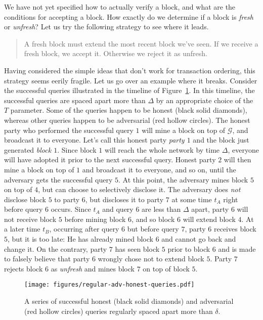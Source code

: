 We have not yet specified how to actually verify a block, and what are the conditions for
accepting a block. How exactly do we determine if a block is \emph{fresh} or \emph{unfresh}? Let
us try the following strategy to see where it leads.

\begin{quote}
A fresh block must extend the most recent block we've seen. If we receive a fresh block, we accept
it. Otherwise we reject it as unfresh.
\end{quote}

Having considered the simple ideas that don't work for transaction ordering, this strategy
seems eerily fragile. Let us go over an example where it breaks. Consider the
successful queries illustrated in the timeline of
Figure~\ref{fig.regular-adv-honest-queries}. In this timeline, the successful queries are spaced
apart more than $\Delta$ by an appropriate choice of the $T$ parameter. Some of the queries happen
to be honest (black solid diamonds), whereas other queries happen to be adversarial (red hollow circles).
The honest party who performed the successful query $1$ will mine a block on top of $\mathcal{G}$,
and broadcast it to everyone. Let's call this honest party \emph{party $1$} and the block just generated
\emph{block $1$}. Since block $1$ will reach the whole network by time $\Delta$,
everyone will have adopted it prior to the next successful query. Honest party $2$ will then
mine a block on top of $1$ and broadcast it to everyone, and so on, until the adversary gets
the successful query $5$. At this point, the adversary mines block $5$ on top of $4$, but can choose
to selectively disclose it. The adversary does \emph{not} disclose block $5$ to party $6$,
but discloses it to party $7$ at some time $t_A$ right before query $6$ occurs. Since $t_A$ and
query $6$ are less than $\Delta$ apart, party $6$ will not receive block $5$ before mining block $6$,
and so block $6$ will extend block $4$. At a later time $t_B$, occurring after query $6$ but before query $7$,
party $6$ receives block $5$, but
it is too late: He has already mined block $6$ and cannot go back and change it.
On the contrary, party $7$ has seen block $5$ prior to block $6$ and is made to falsely believe
that party $6$ wrongly chose not to extend block $5$. Party $7$ rejects block $6$ as \emph{unfresh}
and mines block $7$ on top of block $5$.

\begin{figure}[h]
    \centering
    \texttt{[image: figures/regular-adv-honest-queries.pdf]}
    \caption{A series of successful honest (black solid diamonds) and adversarial (red hollow circles) queries
             regularly spaced apart more than $\delta$.}
    \label{fig.regular-adv-honest-queries}
\end{figure}

